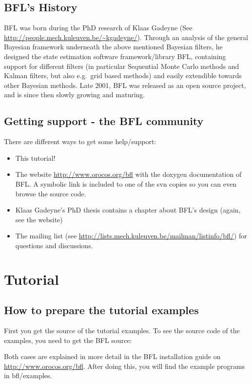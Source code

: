 \documentclass[a4paper,10pt]{report}
\begin{document}
\section{BFL's History}
BFL was born during the PhD research of Klaas Gadeyne (See
\url{http://people.mech.kuleuven.be/~kgadeyne/}).  Through an analysis
of the general Bayesian framework underneath the above mentioned
Bayesian filters, he designed the state estimation software
framework/library BFL, containing support for different filters (in
particular Sequential Monte Carlo methods and Kalman filters, but also
e.g.~grid based methods) and easily extendible towards other Bayesian
methods. Late 2001, BFL was released as an open source project, and is
since then slowly growing and maturing.

\section{Getting support - the BFL community}
There are different ways to get some help/support:
\begin{itemize}
\item This tutorial!
\item The website
  \url{http://www.orocos.org/bfl} with the
  doxygen documentation of BFL. A symbolic link is included to one of
  the svn copies so you can even browse the source code.
\item Klaas Gadeyne's PhD thesis contains a chapter about BFL's design
  (again, see the website)
\item The mailing list (see
  \url{http://lists.mech.kuleuven.be/mailman/listinfo/bfl/}) for
  questions and discussions.
\end{itemize}







\chapter{Tutorial}
\label{chapt:tutorial}
\section{How to prepare the tutorial examples}

First you get the source of the tutorial examples. To see the source
code of the examples, you need to get the BFL source:
\begin{itemize}
\item You can download the bfl tarbal from \url{http://www.orocos.org/bfl/source}, or
\item get BFL from subversion \{http://www.orocos.org/bfl/subversion}.
\end{itemize}
Both cases are explained in more detail in the BFL installation guide on
\url{http://www.orocos.org/bfl}. After doing this, you will find the example
programs in bfl/examples.
\end{document}
